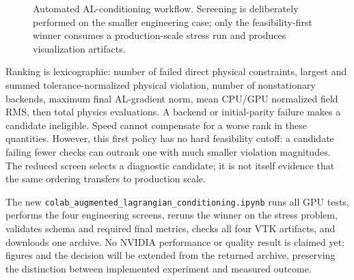 \documentclass[11pt,a4paper]{article}
\newcommand{\code}[1]{\texttt{#1}}
\begin{document}
\begin{figure}[htbp]
\centering
{}
\caption{Automated AL-conditioning workflow.  Screening is deliberately
performed on the smaller engineering case; only the feasibility-first winner
consumes a production-scale stress run and produces visualization artifacts.}
\label{fig:al-conditioning-workflow}
\end{figure}

Ranking is lexicographic: number of failed direct physical constraints,
largest and summed tolerance-normalized physical violation, number of
nonstationary backends, maximum final AL-gradient norm, mean CPU/GPU normalized
field RMS, then total physics evaluations.  A backend or initial-parity failure
makes a candidate ineligible.  Speed cannot compensate for a worse rank in
these quantities.  However, this first policy has no hard feasibility cutoff:
a candidate failing fewer checks can outrank one with much smaller violation
magnitudes.  The reduced screen selects a diagnostic candidate; it is not
itself evidence that the same ordering transfers to production scale.

The new \code{colab\_augmented\_lagrangian\_conditioning.ipynb} runs all GPU
tests, performs the four engineering screens, reruns the winner on the stress
problem, validates schema and required final metrics, checks all four VTK
artifacts, and downloads one archive.  No NVIDIA performance or quality result
is claimed yet: figures and the decision will be extended from the returned
archive, preserving the distinction between implemented experiment and
measured outcome.
\end{document}

